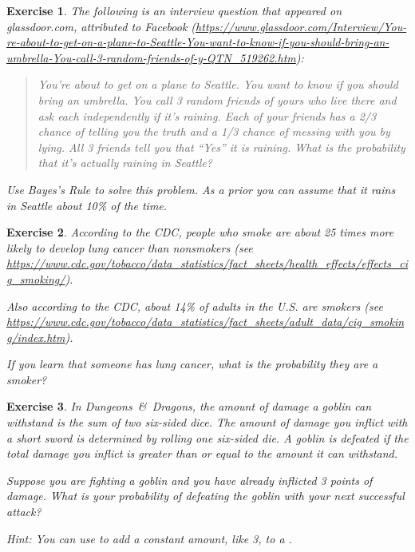\documentclass[12pt]{book}
\theoremstyle{exercise}
\newtheorem{exercise}{Exercise}[chapter]
\begin{document}
\begin{exercise}
The following is an interview question that appeared on glassdoor.com, attributed to Facebook (\url{https://www.glassdoor.com/Interview/You-re-about-to-get-on-a-plane-to-Seattle-You-want-to-know-if-you-should-bring-an-umbrella-You-call-3-random-friends-of-y-QTN_519262.htm}):

\begin{quote}
You're about to get on a plane to Seattle. You want to know if you should bring an umbrella. You call 3 random friends of yours who live there and ask each independently if it's raining. Each of your friends has a 2/3 chance of telling you the truth and a 1/3 chance of messing with you by lying. All 3 friends tell you that ``Yes'' it is raining. What is the probability that it's actually raining in Seattle?
\end{quote}

Use Bayes's Rule to solve this problem.  As a prior you can assume that it rains in Seattle about 10\% of the time.
\end{exercise}


\begin{exercise}
According to the CDC, people who smoke are about 25 times more likely to develop lung cancer than nonsmokers (see \url{https://www.cdc.gov/tobacco/data_statistics/fact_sheets/health_effects/effects_cig_smoking/}).

Also according to the CDC, about 14\% of adults in the U.S. are smokers (see \url{https://www.cdc.gov/tobacco/data_statistics/fact_sheets/adult_data/cig_smoking/index.htm}). 

If you learn that someone has lung cancer, what is the probability they are a smoker?
\end{exercise}


\begin{exercise}
In {\it Dungeons~\&~Dragons}, the amount of damage a goblin can withstand is the sum of two six-sided dice. The amount of damage you inflict with a short sword is determined by rolling one six-sided die.
A goblin is defeated if the total damage you inflict is greater than or equal to the amount it can withstand.

Suppose you are fighting a goblin and you have already inflicted 3 points of damage. What is your probability of defeating the goblin with your next successful attack?

Hint: You can use  to add a constant amount, like 3, to a . 
\end{exercise}
\end{document}
